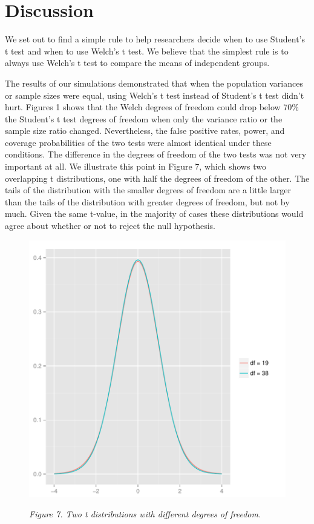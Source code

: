 \documentclass[man,a4paper,noextraspace,apacite]{apa6}
\begin{document}
\section{Discussion}
    We set out to find a simple rule to help researchers decide when to use Student's t test and when to use Welch's t test. We believe that the simplest rule is to always use Welch's t test to compare the means of independent groups.
    
    The results of our simulations demonstrated that when the population variances or sample sizes were equal, using Welch's t test instead of Student's t test didn't hurt. Figures 1 shows that the Welch degrees of freedom could drop below 70\% the Student's t test degrees of freedom when only the variance ratio or the sample size ratio changed. Nevertheless, the false positive rates, power, and coverage probabilities of the two tests were almost identical under these conditions. The difference in the degrees of freedom of the two tests was not very important at all. We illustrate this point in Figure 7, which shows two overlapping t distributions, one with half the degrees of freedom of the other. The tails of the distribution with the smaller degrees of freedom are a little larger than the tails of the distribution with greater degrees of freedom, but not by much. Given the same t-value, in the majority of cases these distributions would agree about whether or not to reject the null hypothesis. 
    
\begin{figure}  
\includegraphics{WelchManuscript-MASTER-tdist}

\textit{Figure 7. Two t distributions with different degrees of freedom.}
\end{figure}
    
\end{document}
